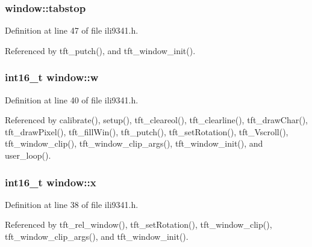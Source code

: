 \subsubsection[{\texorpdfstring{tabstop}{tabstop}}]{ window\+::tabstop}\hypertarget{structwindow_a88d2836d45dd428d8fadfd703f0f965f}{}\label{structwindow_a88d2836d45dd428d8fadfd703f0f965f}


Definition at line 47 of file ili9341.\+h.



Referenced by tft\+\_\+putch(), and tft\+\_\+window\+\_\+init().

\subsubsection[{\texorpdfstring{w}{w}}]{\setlength{\rightskip}{0pt plus 5cm}int16\+\_\+t window\+::w}\hypertarget{structwindow_ad89fdeb11ce94e2e7501f7290372d6ae}{}\label{structwindow_ad89fdeb11ce94e2e7501f7290372d6ae}


Definition at line 40 of file ili9341.\+h.



Referenced by calibrate(), setup(), tft\+\_\+cleareol(), tft\+\_\+clearline(), tft\+\_\+draw\+Char(), tft\+\_\+draw\+Pixel(), tft\+\_\+fill\+Win(), tft\+\_\+putch(), tft\+\_\+set\+Rotation(), tft\+\_\+\+Vscroll(), tft\+\_\+window\+\_\+clip(), tft\+\_\+window\+\_\+clip\+\_\+args(), tft\+\_\+window\+\_\+init(), and user\+\_\+loop().

\subsubsection[{\texorpdfstring{x}{x}}]{\setlength{\rightskip}{0pt plus 5cm}int16\+\_\+t window\+::x}\hypertarget{structwindow_a879b99940dfc34772f0257f54c67b817}{}\label{structwindow_a879b99940dfc34772f0257f54c67b817}


Definition at line 38 of file ili9341.\+h.



Referenced by tft\+\_\+rel\+\_\+window(), tft\+\_\+set\+Rotation(), tft\+\_\+window\+\_\+clip(), tft\+\_\+window\+\_\+clip\+\_\+args(), and tft\+\_\+window\+\_\+init().


